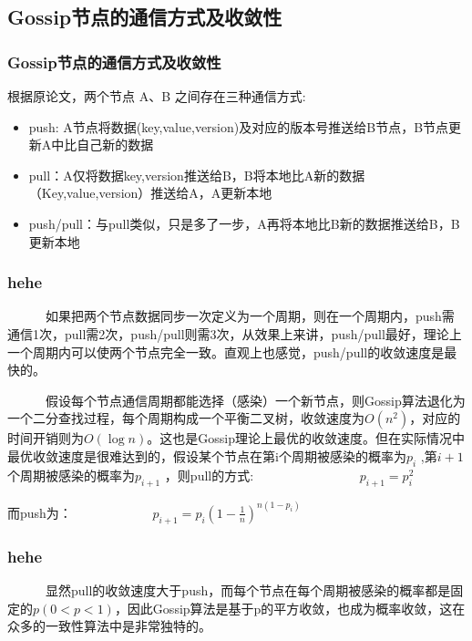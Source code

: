 \documentclass[slidestop,compress,mathserif,c]{beamer}
\begin{document}
\subsection{\hfill  Gossip节点的通信方式及收敛性}
\begin{frame}
\frametitle{ Gossip节点的通信方式及收敛性}
 根据原论文，两个节点 A、B 之间存在三种通信方式:
 \begin{itemize}
 \item push: A节点将数据(key,value,version)及对应的版本号推送给B节点，B节点更新A中比自己新的数据
 \item pull：A仅将数据key,version推送给B，B将本地比A新的数据（Key,value,version）推送给A，A更新本地
 \item push/pull：与pull类似，只是多了一步，A再将本地比B新的数据推送给B，B更新本地
 \end{itemize}
\end{frame}

\begin{frame}
\frametitle{hehe}
 ~~~~~~如果把两个节点数据同步一次定义为一个周期，则在一个周期内，push需通信1次，pull需2次，push/pull则需3次，从效果上来讲，push/pull最好，理论上一个周期内可以使两个节点完全一致。直观上也感觉，push/pull的收敛速度是最快的。

~~~~~~假设每个节点通信周期都能选择（感染）一个新节点，则Gossip算法退化为一个二分查找过程，每个周期构成一个平衡二叉树，收敛速度为$O(n^2)$，对应的时间开销则为$O(\log n)$。这也是Gossip理论上最优的收敛速度。但在实际情况中最优收敛速度是很难达到的，假设某个节点在第i个周期被感染的概率为$p_i$ ,第$i+1$个周期被感染的概率为$p_{i+1}$ ，则pull的方式:
~~~~~~~~~~~~~~~~$ p_{i+1} =p_i^2$

而push为：~~~~~~~~~~~~
$p_{i+1}=p_i(1-\frac{1}{n})^{n(1-p_i)}$
\end{frame}

\begin{frame}
\frametitle{hehe}
 ~~~~~~显然pull的收敛速度大于push，而每个节点在每个周期被感染的概率都是固定的$p(0<p<1)$，因此Gossip算法是基于p的平方收敛，也成为概率收敛，这在众多的一致性算法中是非常独特的。
\end{frame}
\end{document}
